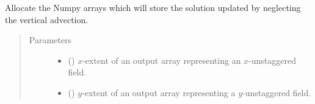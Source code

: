 \documentclass[letterpaper,10pt,english]{sphinxmanual}
\begin{document}
\begin{fulllineitems}
\begin{fulllineitems}
\begin{quote}
\begin{description}
\begin{itemize}
\end{itemize}

\end{description}\end{quote}

\end{fulllineitems}


\begin{fulllineitems}
\label{\detokenize{api:tasmania.dycore.prognostic_isentropic.PrognosticIsentropic._stencils_stepping_by_neglecting_vertical_advection_allocate_outputs}}
Allocate the Numpy arrays which will store the solution updated by neglecting the vertical advection.
\begin{quote}\begin{description}
\item[{Parameters}] \leavevmode\begin{itemize}
\item {} 
 () \textendash{} \(x\)-extent of an output array representing an \(x\)-unstaggered field.

\item {} 
 () \textendash{} \(y\)-extent of an output array representing a \(y\)-unstaggered field.

\end{itemize}

\end{description}\end{quote}

\end{fulllineitems}



\end{fulllineitems}
\end{document}
